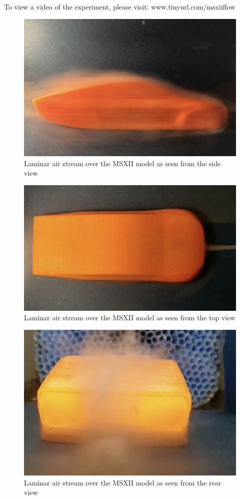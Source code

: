 \documentclass[12pt]{article}
\begin{document}
To view a video of the experiment, please visit: www.tinyurl.com/msxiiflow

\begin{figure}[h!]
	\centering
	\includegraphics[width=.7\textwidth]{./images/sideFlow1.jpg}
    \captionsetup{justification=centering,margin=2cm}
	\caption{Laminar air stream over the MSXII model as seen from the side view}
	\label{fig:sideFlow}
\end{figure}

\begin{figure}[h!]
	\centering
	\includegraphics[width=.7\textwidth]{./images/topFlow1.jpg}
    \captionsetup{justification=centering,margin=2cm}
	\caption{Laminar air stream over the MSXII model as seen from the top view}
	\label{fig:topFlow}
\end{figure}

\begin{figure}[h!]
	\centering
	\includegraphics[width=.7\textwidth]{./images/rearFlow1.jpg}
    \captionsetup{justification=centering,margin=2cm}
	\caption{Laminar air stream over the MSXII model as seen from the rear view}
	\label{fig:rearFlow}
\end{figure}


\pagebreak
{}

\end{document}

